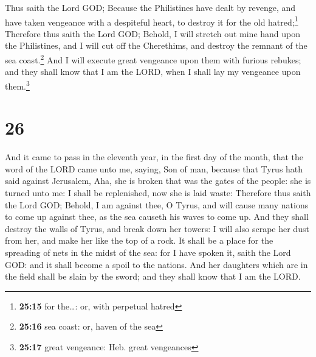  Thus saith the Lord GOD; Because the Philistines have
dealt by revenge, and have taken vengeance with a despiteful heart, to
destroy it for the old hatred;\footnote{\textbf{25:15} for the\ldots:
  or, with perpetual hatred}  Therefore thus saith the
Lord GOD; Behold, I will stretch out mine hand upon the Philistines, and
I will cut off the Cherethims, and destroy the remnant of the sea
coast.\footnote{\textbf{25:16} sea coast: or, haven of the sea}
 And I will execute great vengeance upon them with
furious rebukes; and they shall know that I am the LORD, when I shall
lay my vengeance upon them.\footnote{\textbf{25:17} great vengeance:
  Heb. great vengeances}

\hypertarget{section-25}{%
\section{26}\label{section-25}}

 And it came to pass in the eleventh year, in the first
day of the month, that the word of the LORD came unto me, saying,
 Son of man, because that Tyrus hath said against
Jerusalem, Aha, she is broken that was the gates of the people: she is
turned unto me: I shall be replenished, now she is laid waste:
 Therefore thus saith the Lord GOD; Behold, I am against
thee, O Tyrus, and will cause many nations to come up against thee, as
the sea causeth his waves to come up.  And they shall
destroy the walls of Tyrus, and break down her towers: I will also
scrape her dust from her, and make her like the top of a rock.
 It shall be a place for the spreading of nets in the
midst of the sea: for I have spoken it, saith the Lord GOD: and it shall
become a spoil to the nations.  And her daughters which
are in the field shall be slain by the sword; and they shall know that I
am the LORD.

